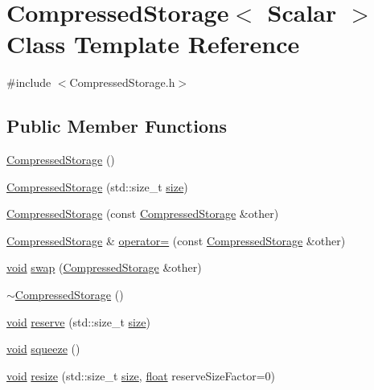 \hypertarget{class_compressed_storage}{\section{Compressed\-Storage$<$ Scalar $>$ Class Template Reference}
\label{class_compressed_storage}
}


{\ttfamily \#include $<$Compressed\-Storage.\-h$>$}

\subsection*{Public Member Functions}
\begin{DoxyCompactItemize}
\item 
\hyperlink{class_compressed_storage_a2dfbc9a431459ee7c7b1e17825218a0e}{Compressed\-Storage} ()
\item 
\hyperlink{class_compressed_storage_a63b4e49efe24b16591ac8eea5cea2d70}{Compressed\-Storage} (std\-::size\-\_\-t \hyperlink{glext_8h_a014d89bd76f74ef3a29c8f04b473eb76}{size})
\item 
\hyperlink{class_compressed_storage_a48222f2794c9eb76adfe004ff0b88a44}{Compressed\-Storage} (const \hyperlink{class_compressed_storage}{Compressed\-Storage} \&other)
\item 
\hyperlink{class_compressed_storage}{Compressed\-Storage} \& \hyperlink{class_compressed_storage_aebaf9b562453d5c22285e7dea93f5c28}{operator=} (const \hyperlink{class_compressed_storage}{Compressed\-Storage} \&other)
\item 
\hyperlink{group___u_a_v_objects_plugin_ga444cf2ff3f0ecbe028adce838d373f5c}{void} \hyperlink{class_compressed_storage_ac7d9571b019fc5acf691fd387ef14bc1}{swap} (\hyperlink{class_compressed_storage}{Compressed\-Storage} \&other)
\item 
\hyperlink{class_compressed_storage_a4cbc51bde4858175aaf3400e7fecdfd5}{$\sim$\-Compressed\-Storage} ()
\item 
\hyperlink{group___u_a_v_objects_plugin_ga444cf2ff3f0ecbe028adce838d373f5c}{void} \hyperlink{class_compressed_storage_ae4a03abc632830893c1a989e6e54bc68}{reserve} (std\-::size\-\_\-t \hyperlink{glext_8h_a014d89bd76f74ef3a29c8f04b473eb76}{size})
\item 
\hyperlink{group___u_a_v_objects_plugin_ga444cf2ff3f0ecbe028adce838d373f5c}{void} \hyperlink{class_compressed_storage_a729d14a9e44264199c104095cc47b2f6}{squeeze} ()
\item 
\hyperlink{group___u_a_v_objects_plugin_ga444cf2ff3f0ecbe028adce838d373f5c}{void} \hyperlink{class_compressed_storage_ae110ac5eee434be9852b7459d22ae0f8}{resize} (std\-::size\-\_\-t \hyperlink{glext_8h_a014d89bd76f74ef3a29c8f04b473eb76}{size}, \hyperlink{_super_l_u_support_8h_a6a1bb6ed41f44b60e7bd83b0e9945aa7}{float} reserve\-Size\-Factor=0)

\end{DoxyCompactItemize}
